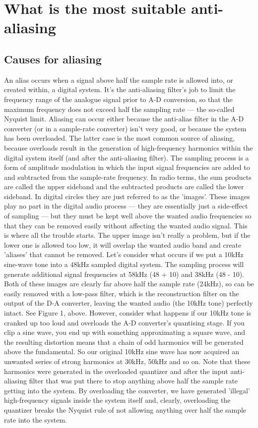       \section{What is the most suitable anti-aliasing}  

      \subsection{Causes for aliasing}
      An alias occurs when a signal above half the sample rate is allowed into, or created within, a digital system. It's the anti-aliasing filter's job to limit the frequency range of the analogue signal prior to A-D conversion, so that the maximum frequency does not exceed half the sampling rate — the so-called Nyquist limit.
      Aliasing can occur either because the anti-alias filter in the A-D converter (or in a sample-rate converter) isn't very good, or because the system has been overloaded. The latter case is the most common source of aliasing, because overloads result in the generation of high-frequency harmonics within the digital system itself (and after the anti-aliasing filter).
      The sampling process is a form of amplitude modulation in which the input signal frequencies are added to and subtracted from the sample-rate frequency. In radio terms, the sum products are called the upper sideband and the subtracted products are called the lower sideband. In digital circles they are just referred to as the 'images'.
      These images play no part in the digital audio process — they are essentially just a side-effect of sampling — but they must be kept well above the wanted audio frequencies so that they can be removed easily without affecting the wanted audio signal. This is where all the trouble starts. The upper image isn't really a problem, but if the lower one is allowed too low, it will overlap the wanted audio band and create 'aliases' that cannot be removed.
      Let's consider what occurs if we put a 10kHz sine-wave tone into a 48kHz sampled digital system. The sampling process will generate additional signal frequencies at 58kHz (48 + 10) and 38kHz (48 - 10). Both of these images are clearly far above half the sample rate (24kHz), so can be easily removed with a low-pass filter, which is the reconstruction filter on the output of the D-A converter, leaving the wanted audio (the 10kHz tone) perfectly intact. See Figure 1, above.
      However, consider what happens if our 10kHz tone is cranked up too loud and overloads the A-D converter's quantising stage. If you clip a sine wave, you end up with something approximating a square wave, and the resulting distortion means that a chain of odd harmonics will be generated above the fundamental. So our original 10kHz sine wave has now acquired an unwanted series of strong harmonics at 30kHz, 50kHz and so on.
      Note that these harmonics were generated in the overloaded quantizer and after the input anti-aliasing filter that was put there to stop anything above half the sample rate getting into the system. By overloading the converter, we have generated 'illegal' high-frequency signals inside the system itself and, clearly, overloading the quantizer breaks the Nyquist rule of not allowing anything over half the sample rate into the system.

